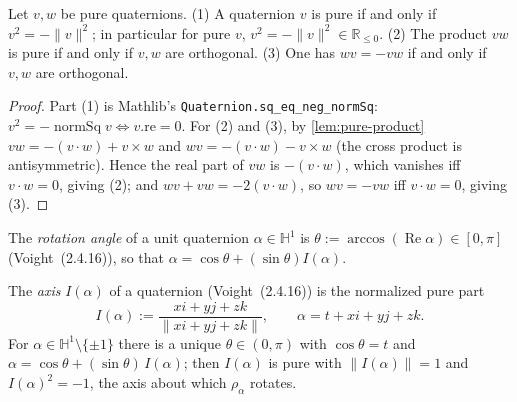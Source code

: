 \begin{lemma}
    \label{lem:pure-properties}
    \leanok
    Let $v, w$ be pure quaternions.
    (1) A quaternion $v$ is pure if and only if $v^2 = -\lVert v\rVert^2$; in
    particular for pure $v$, $v^2 = -\lVert v\rVert^2 \in \mathbb{R}_{\le 0}$.
    (2) The product $vw$ is pure if and only if $v, w$ are orthogonal.
    (3) One has $wv = -vw$ if and only if $v, w$ are orthogonal.
\end{lemma}
\begin{proof}
    Part (1) is Mathlib's \texttt{Quaternion.sq\_eq\_neg\_normSq}:
    $v^2 = -\operatorname{normSq} v \iff v.\mathrm{re} = 0$. For (2) and (3), by
    \ref{lem:pure-product} $vw = -(v\cdot w) + v\times w$ and
    $wv = -(v\cdot w) - v\times w$ (the cross product is antisymmetric). Hence the
    real part of $vw$ is $-(v\cdot w)$, which vanishes iff $v\cdot w = 0$, giving
    (2); and $wv + vw = -2(v\cdot w)$, so $wv = -vw$ iff $v\cdot w = 0$, giving (3).
\end{proof}

\begin{definition}
    \label{def:rot-angle}
    \leanok
    The \emph{rotation angle} of a unit quaternion $\alpha \in \mathbb{H}^1$ is
    $\theta := \arccos(\operatorname{Re}\alpha) \in [0, \pi]$ (Voight~(2.4.16)), so
    that $\alpha = \cos\theta + (\sin\theta)I(\alpha)$.
\end{definition}

\begin{definition}
    \label{def:axis}
    \leanok
    The \emph{axis} $I(\alpha)$ of a quaternion (Voight~(2.4.16)) is the normalized
    pure part
    \[
      I(\alpha) := \frac{xi + yj + zk}{\lVert xi + yj + zk\rVert}, \qquad
      \alpha = t + xi + yj + zk.
    \]
    For $\alpha \in \mathbb{H}^1 \setminus \{\pm 1\}$ there is a unique
    $\theta \in (0, \pi)$ with $\cos\theta = t$ and
    $\alpha = \cos\theta + (\sin\theta)\,I(\alpha)$; then $I(\alpha)$ is pure with
    $\lVert I(\alpha)\rVert = 1$ and $I(\alpha)^2 = -1$, the axis about which
    $\rho_\alpha$ rotates.
\end{definition}

